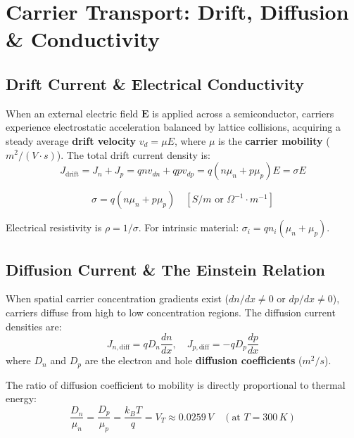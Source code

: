 \section{Carrier Transport: Drift, Diffusion \& Conductivity}

\subsection{Drift Current \& Electrical Conductivity}
When an external electric field $\mathbf{E}$ is applied across a semiconductor, carriers experience electrostatic acceleration balanced by lattice collisions, acquiring a steady average \textbf{drift velocity} $v_d = \mu E$, where $\mu$ is the \textbf{carrier mobility} ($\si{m^2/(V\cdot s)}$). The total drift current density is:
\begin{equation}
    J_{\text{drift}} = J_n + J_p = q n v_{dn} + q p v_{dp} = q(n\mu_n + p\mu_p)E = \sigma E
\end{equation}

\begin{keyequation}
\begin{equation}
    \sigma = q(n\mu_n + p\mu_p) \quad [\si{S/m} \text{ or } \si{\Omega^{-1}\cdot m^{-1}}]
\end{equation}
\end{keyequation}
Electrical resistivity is $\rho = 1/\sigma$. For intrinsic material: $\sigma_i = q n_i(\mu_n + \mu_p)$.

\subsection{Diffusion Current \& The Einstein Relation}
When spatial carrier concentration gradients exist ($dn/dx \neq 0$ or $dp/dx \neq 0$), carriers diffuse from high to low concentration regions. The diffusion current densities are:
\begin{equation}
    J_{n,\text{diff}} = q D_n \frac{dn}{dx}, \quad J_{p,\text{diff}} = -q D_p \frac{dp}{dx}
\end{equation}
where $D_n$ and $D_p$ are the electron and hole \textbf{diffusion coefficients} ($\si{m^2/s}$).

\begin{keyequation}
The ratio of diffusion coefficient to mobility is directly proportional to thermal energy:
\begin{equation}
    \frac{D_n}{\mu_n} = \frac{D_p}{\mu_p} = \frac{k_B T}{q} = V_T \approx 0.0259\,\si{V} \quad (\text{at } T = 300\,\si{K})
\end{equation}
\end{keyequation}

